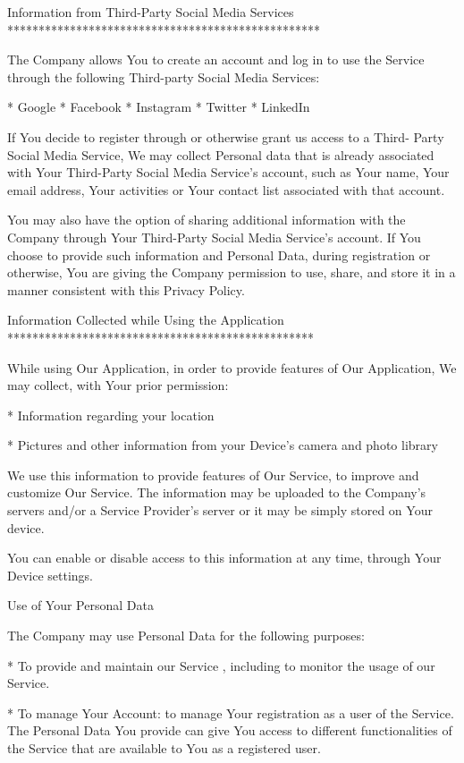 Information from Third-Party Social Media Services  
**************************************************

The Company allows You to create an account and log in to use the Service
through the following Third-party Social Media Services:

  * Google
  * Facebook
  * Instagram
  * Twitter
  * LinkedIn

If You decide to register through or otherwise grant us access to a Third-
Party Social Media Service, We may collect Personal data that is already
associated with Your Third-Party Social Media Service's account, such as Your
name, Your email address, Your activities or Your contact list associated with
that account.

You may also have the option of sharing additional information with the
Company through Your Third-Party Social Media Service's account. If You choose
to provide such information and Personal Data, during registration or
otherwise, You are giving the Company permission to use, share, and store it
in a manner consistent with this Privacy Policy.

Information Collected while Using the Application  
*************************************************

While using Our Application, in order to provide features of Our Application,
We may collect, with Your prior permission:

  * Information regarding your location

  * Pictures and other information from your Device's camera and photo library


We use this information to provide features of Our Service, to improve and
customize Our Service. The information may be uploaded to the Company's
servers and/or a Service Provider's server or it may be simply stored on Your
device.

You can enable or disable access to this information at any time, through Your
Device settings.

Use of Your Personal Data  
~~~~~~~~~~~~~~~~~~~~~~~~~

The Company may use Personal Data for the following purposes:

  * To provide and maintain our Service , including to monitor the usage of
    our Service.

  * To manage Your Account: to manage Your registration as a user of the
    Service. The Personal Data You provide can give You access to different
    functionalities of the Service that are available to You as a registered
    user.

